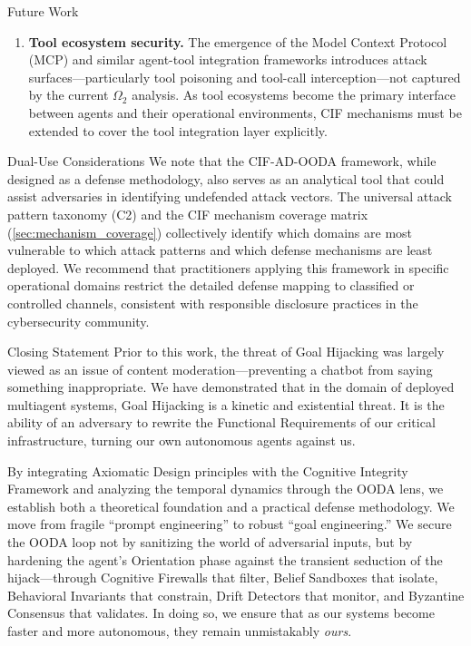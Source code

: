 \documentclass[
  ignorenonframetext,
]{beamer}
\begin{document}
\begin{frame}[allowframebreaks]{Future Work}
\begin{enumerate}
  \(\Omega_3\)--\(\Omega_5\) attacks and multi-class compositions would
  address the scope limitation identified in
  \cref{sec:limitations_discussion}.
\item
  \textbf{Tool ecosystem security.} The emergence of the Model Context
  Protocol (MCP) and similar agent-tool integration frameworks
  introduces attack surfaces---particularly tool poisoning and tool-call
  interception---not captured by the current \(\Omega_2\) analysis. As
  tool ecosystems become the primary interface between agents and their
  operational environments, CIF mechanisms must be extended to cover the
  tool integration layer explicitly.
\end{enumerate}

\begin{block}{Dual-Use Considerations}
\protect{}\label{dual-use-considerations}
We note that the CIF-AD-OODA framework, while designed as a defense
methodology, also serves as an analytical tool that could assist
adversaries in identifying undefended attack vectors. The universal
attack pattern taxonomy (C2) and the CIF mechanism coverage matrix
(\cref{sec:mechanism_coverage}) collectively identify which domains are
most vulnerable to which attack patterns and which defense mechanisms
are least deployed. We recommend that practitioners applying this
framework in specific operational domains restrict the detailed defense
mapping to classified or controlled channels, consistent with
responsible disclosure practices in the cybersecurity community.
\end{block}
\end{frame}

\begin{frame}[allowframebreaks]{Closing Statement}
\protect{}\label{closing-statement}
Prior to this work, the threat of Goal Hijacking was largely viewed as
an issue of content moderation---preventing a chatbot from saying
something inappropriate. We have demonstrated that in the domain of
deployed multiagent systems, Goal Hijacking is a kinetic and existential
threat. It is the ability of an adversary to rewrite the Functional
Requirements of our critical infrastructure, turning our own autonomous
agents against us.

By integrating Axiomatic Design principles with the Cognitive Integrity
Framework and analyzing the temporal dynamics through the OODA lens, we
establish both a theoretical foundation and a practical defense
methodology. We move from fragile ``prompt engineering'' to robust
``goal engineering.'' We secure the OODA loop not by sanitizing the
world of adversarial inputs, but by hardening the agent's Orientation
phase against the transient seduction of the hijack---through Cognitive
Firewalls that filter, Belief Sandboxes that isolate, Behavioral
Invariants that constrain, Drift Detectors that monitor, and Byzantine
Consensus that validates. In doing so, we ensure that as our systems
become faster and more autonomous, they remain unmistakably \emph{ours}.
\end{frame}
\end{document}
